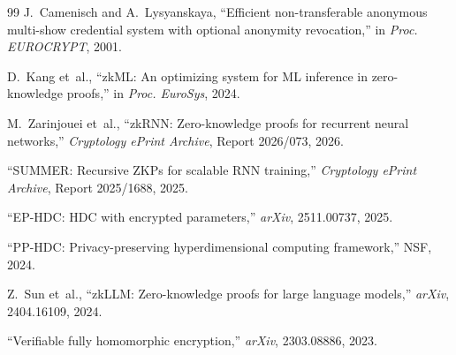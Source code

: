 \documentclass[11pt,twocolumn]{article}
\begin{document}
\begin{thebibliography}{99}
J.~Camenisch and A.~Lysyanskaya, ``Efficient non-transferable anonymous multi-show credential system with optional anonymity revocation,'' in \emph{Proc. EUROCRYPT}, 2001.

D.~Kang et~al., ``zkML: An optimizing system for ML inference in zero-knowledge proofs,'' in \emph{Proc. EuroSys}, 2024.

M.~Zarinjouei et~al., ``zkRNN: Zero-knowledge proofs for recurrent neural networks,'' \emph{Cryptology ePrint Archive}, Report 2026/073, 2026.

``SUMMER: Recursive ZKPs for scalable RNN training,'' \emph{Cryptology ePrint Archive}, Report 2025/1688, 2025.

``EP-HDC: HDC with encrypted parameters,'' \emph{arXiv}, 2511.00737, 2025.

``PP-HDC: Privacy-preserving hyperdimensional computing framework,'' NSF, 2024.

Z.~Sun et~al., ``zkLLM: Zero-knowledge proofs for large language models,'' \emph{arXiv}, 2404.16109, 2024.

``Verifiable fully homomorphic encryption,'' \emph{arXiv}, 2303.08886, 2023.

\end{thebibliography}
\end{document}
